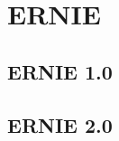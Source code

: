 \section{ERNIE} \label{sec:ERNIE}

\subsection{ERNIE 1.0} \label{sec:ERNIE_1}

\subsection{ERNIE 2.0} \label{sec:ERNIE_2}